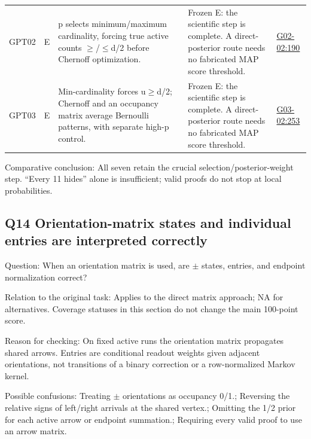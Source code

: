 \documentclass[11pt,a4paper]{article}
\begin{document}
{\begin{longtable}
{}GPT02 & E & p selects minimum/\allowbreak{}maximum cardinality,\allowbreak{} forcing true active counts \ensuremath{\geq}/\allowbreak{}\ensuremath{\leq}d/\allowbreak{}2 before Chernoff optimization. & Frozen E: the scientific step is complete. A direct-posterior route needs no fabricated MAP score threshold. & \hyperref[src:G02-02]{G02-02:190}\tabularnewline
{}GPT03 & E & Min-cardinality forces u\ensuremath{\geq}d/\allowbreak{}2; Chernoff and an occupancy matrix average Bernoulli patterns,\allowbreak{} with separate high-p control. & Frozen E: the scientific step is complete. A direct-posterior route needs no fabricated MAP score threshold. & \hyperref[src:G03-02]{G03-02:253}\tabularnewline
\bottomrule
\end{longtable}
}
Comparative conclusion: All seven retain the crucial selection/\allowbreak{}posterior-weight step. “Every 11 hides” alone is insufficient; valid proofs do not stop at local probabilities.

\clearpage
\subsection{Q14 Orientation-matrix states and individual entries are interpreted correctly}
\label{aspect:Q14}
Question: When an orientation matrix is used,\allowbreak{} are \ensuremath{\pm} states,\allowbreak{} entries,\allowbreak{} and endpoint normalization correct?

Relation to the original task: Applies to the direct matrix approach; NA for alternatives. Coverage statuses in this section do not change the main 100-point score.

Reason for checking: On fixed active runs the orientation matrix propagates shared arrows. Entries are conditional readout weights given adjacent orientations,\allowbreak{} not transitions of a binary correction or a row-normalized Markov kernel.

Possible confusions: Treating \ensuremath{\pm} orientations as occupancy 0/\allowbreak{}1.; Reversing the relative signs of left/\allowbreak{}right arrivals at the shared vertex.; Omitting the 1/\allowbreak{}2 prior for each active arrow or endpoint summation.; Requiring every valid proof to use an arrow matrix.
\end{document}
